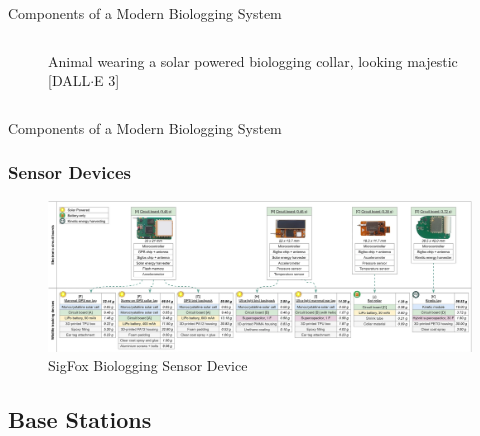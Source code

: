 \documentclass{beamer}
\begin{document}
\begin{frame}{Components of a Modern Biologging System}
\begin{columns}
\begin{column}{0.5\textwidth}
\begin{figure}[htbp]
          \caption{Animal wearing a solar powered biologging collar, looking majestic [DALL$\cdot$E 3]}
          \label{fig:Solar_collar}
        \end{figure}
    \end{column}
    \end{columns}
  \end{frame}

  \begin{frame}{Components of a Modern Biologging System}
    \frametitle{Sensor Devices}
    \begin{figure}[htbp]
      \centering
      \includegraphics[width=\textwidth]{SigFox_Sensor_device.png}
      \caption{SigFox Biologging Sensor Device \cite{wild2023multi}}
      \label{fig:SigFox_Biologging_device}
    \end{figure}
  \end{frame}

\subsection{Base Stations}
\end{document}
